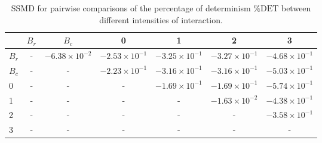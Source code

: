 \begin{table}
\centering
\caption{SSMD for pairwise comparisons of the percentage of determinism $\%\text{DET}$ between different intensities of interaction.}
\label{tab:ssmd_det}
\begin{tabular}{lcccccc}
\toprule
 & $B_r$ & $B_c$ & 0 & 1 & 2 & 3 \\
\midrule
$B_r$ & - & $-6.38 \times 10^{-2}$ & $-2.53 \times 10^{-1}$ & $-3.25 \times 10^{-1}$ & $-3.27 \times 10^{-1}$ & $-4.68 \times 10^{-1}$ \\
$B_c$ & - & - & $-2.23 \times 10^{-1}$ & $-3.16 \times 10^{-1}$ & $-3.16 \times 10^{-1}$ & $-5.03 \times 10^{-1}$ \\
0 & - & - & - & $-1.69 \times 10^{-1}$ & $-1.69 \times 10^{-1}$ & $-5.74 \times 10^{-1}$ \\
1 & - & - & - & - & $-1.63 \times 10^{-2}$ & $-4.38 \times 10^{-1}$ \\
2 & - & - & - & - & - & $-3.58 \times 10^{-1}$ \\
3 & - & - & - & - & - & - \\
\bottomrule
\end{tabular}
\end{table}
